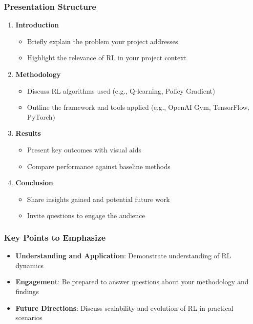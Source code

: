 \documentclass[aspectratio=169]{beamer}
\begin{document}
\begin{frame}[fragile]
    \frametitle{Presentation Structure}
    \begin{enumerate}
        \item \textbf{Introduction}
            \begin{itemize}
                \item Briefly explain the problem your project addresses
                \item Highlight the relevance of RL in your project context
            \end{itemize}
        \item \textbf{Methodology}
            \begin{itemize}
                \item Discuss RL algorithms used (e.g., Q-learning, Policy Gradient)
                \item Outline the framework and tools applied (e.g., OpenAI Gym, TensorFlow, PyTorch)
            \end{itemize}
        \item \textbf{Results}
            \begin{itemize}
                \item Present key outcomes with visual aids
                \item Compare performance against baseline methods
            \end{itemize}
        \item \textbf{Conclusion}
            \begin{itemize}
                \item Share insights gained and potential future work
                \item Invite questions to engage the audience
            \end{itemize}
    \end{enumerate}
\end{frame}

\begin{frame}[fragile]
    \frametitle{Key Points to Emphasize}
    \begin{itemize}
        \item \textbf{Understanding and Application}: Demonstrate understanding of RL dynamics
        \item \textbf{Engagement}: Be prepared to answer questions about your methodology and findings
        \item \textbf{Future Directions}: Discuss scalability and evolution of RL in practical scenarios
    \end{itemize}
\end{frame}
\end{document}
